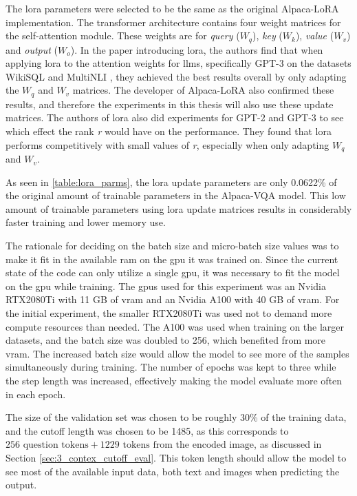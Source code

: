     The \gls{lora} parameters were selected to be the same as the original Alpaca-LoRA implementation. 
    The transformer architecture contains four weight matrices for the self-attention module. These weights are for \textit{query} ($W_q$), \textit{key} ($W_k$), \textit{value} ($W_v$) and \textit{output} ($W_o$).
    In the paper introducing \gls{lora}, the authors find that when applying \gls{lora} to the attention weights for \glspl{llm}, specifically GPT-3 on the datasets WikiSQL \cite{zhongSeq2SQLGeneratingStructured2017} and MultiNLI \cite{williamsBroadCoverageChallengeCorpus2018}, they achieved the best results overall by only adapting the $W_q$ and $W_v$ matrices. The developer of Alpaca-LoRA also confirmed these results, and therefore the experiments in this thesis will also use these update matrices.
    The authors of \gls{lora} also did experiments for GPT-2 and GPT-3 to see which effect the rank \textit{r} would have on the performance. They found that \gls{lora} performs competitively with small values of \textit{r}, especially when only adapting $W_q$ and $W_v$.

    As seen in \autoref{table:lora_parms}, the \gls{lora} update parameters are only 0.0622\% of the original amount of trainable parameters in the Alpaca-VQA model. This low amount of trainable parameters using \gls{lora} update matrices results in considerably faster training and lower memory use.

    
    The rationale for deciding on the batch size and micro-batch size values was to make it fit in the available \gls{ram} on the \gls{gpu} it was trained on. Since the current state of the code can only utilize a single \gls{gpu}, it was necessary to fit the model on the \gls{gpu} while training. 
    The \glspl{gpu} used for this experiment was an Nvidia RTX2080Ti with 11 GB of \gls{vram} and an Nvidia A100 with 40 GB of \gls{vram}. For the initial experiment, the smaller RTX2080Ti was used not to demand more compute resources than needed. The A100 was used when training on the larger datasets, and the batch size was doubled to 256, which benefited from more \gls{vram}. The increased batch size would allow the model to see more of the samples simultaneously during training.
    The number of epochs was kept to three while the step length was increased, effectively making the model evaluate more often in each epoch.
    
    The size of the validation set was chosen to be roughly 30\% of the training data, and the cutoff length was chosen to be 1485, as this corresponds to $256 \text{ question tokens} + 1229 \text{ tokens from the encoded image}$, as discussed in Section \ref{sec:3_contex_cutoff_eval}. This token length should allow the model to see most of the available input data, both text and images when predicting the output.

